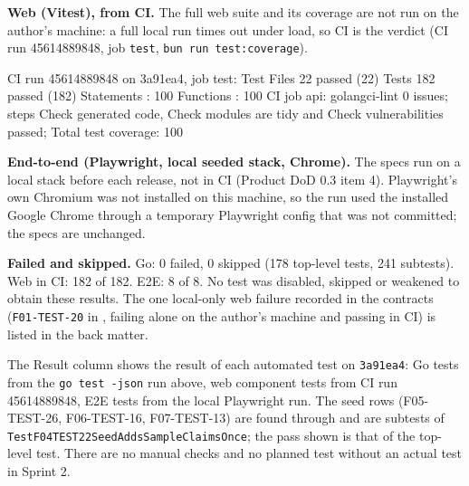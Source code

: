 \textbf{Web (Vitest), from CI.} The full web suite and its coverage are not run on the author's machine: a full local run times out under load, so CI is the verdict (CI run 45614889848, job \texttt{test}, \texttt{bun run test:coverage}).

\begin{shell}
CI run 45614889848 on 3a91ea4, job test:
 Test Files  22 passed (22)
      Tests  182 passed (182)
 Statements : 100%
 Functions  : 100%
CI job api: golangci-lint 0 issues; steps Check generated code, Check modules are tidy and
            Check vulnerabilities passed;
            Total test coverage: 100%
\end{shell}

\textbf{End-to-end (Playwright, local seeded stack, Chrome).} The specs run on a local stack before each release, not in CI (Product DoD 0.3 item 4). Playwright's own Chromium was not installed on this machine, so the run used the installed Google Chrome through a temporary Playwright config that was not committed; the specs are unchanged.


\textbf{Failed and skipped.} Go: 0 failed, 0 skipped (178 top-level tests, 241 subtests). Web in CI: 182 of 182. E2E: 8 of 8. No test was disabled, skipped or weakened to obtain these results. The one local-only web failure recorded in the contracts (\texttt{F01-TEST-20} in , failing alone on the author's machine and passing in CI) is listed in the back matter.



\noindent The Result column shows the result of each automated test on \texttt{3a91ea4}: Go tests from the \texttt{go test -json} run above, web component tests from CI run 45614889848, E2E tests from the local Playwright run. The seed rows (F05-TEST-26, F06-TEST-16, F07-TEST-13) are found through  and are subtests of \texttt{TestF04TEST22SeedAddsSampleClaimsOnce}; the pass shown is that of the top-level test. There are no manual checks and no planned test without an actual test in Sprint 2.

